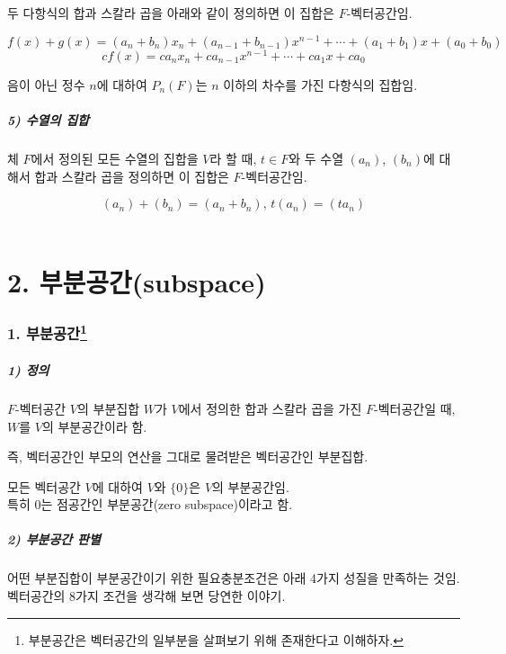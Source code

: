 두 다항식의 합과 스칼라 곱을 아래와 같이 정의하면 이 집합은 $F$-벡터공간임.

\[f(x)+g(x)=(a_n+b_n)x_n+(a_{n-1}+b_{n-1})x^{n-1}+ \cdots +(a_1+b_1)x+(a_0+b_0)\]
\[cf(x)=ca_nx_n+ca_{n-1}x^{n-1}+ \cdots +ca_1x+ca_0\]

음이 아닌 정수 $n$에 대하여 $P_n(F)$는 $n$ 이하의 차수를 가진 다항식의 집합임.


\subsubsection*{5) 수열의 집합}
체 $F$에서 정의된 모든 수열의 집합을 $V$라 할 때, $t \in F$와 두 수열 $(a_n)$, $(b_n)$에 대해서 합과 스칼라 곱을 정의하면 이 집합은 $F$-벡터공간임.

\[(a_n)+(b_n)=(a_n+b_n),\,t(a_n)=(ta_n)\]\\


\newpage


\part*{2. 부분공간(subspace)}

\section*{1. 부분공간\footnote{부분공간은 벡터공간의 일부분을 살펴보기 위해 존재한다고 이해하자.}}
\subsubsection*{1) 정의\\}
\begin{DEF}
$F$-벡터공간 $V$의 부분집합 $W$가 $V$에서 정의한 합과 스칼라 곱을 가진 $F$-벡터공간일 때, $W$를 $V$의 부분공간이라 함.
\end{DEF}

즉, 벡터공간인 부모의 연산을 그대로 물려받은 벡터공간인 부분집합.

모든 벡터공간 $V$에 대하여 $V$와 $\{ 0 \}$은 $V$의 부분공간임.\\
특히 ${0}$는 점공간인 부분공간(zero subspace)이라고 함.

\subsubsection*{2) 부분공간 판별}
어떤 부분집합이 부분공간이기 위한 필요충분조건은 아래 4가지 성질을 만족하는 것임.\\
벡터공간의 8가지 조건을 생각해 보면 당연한 이야기.


